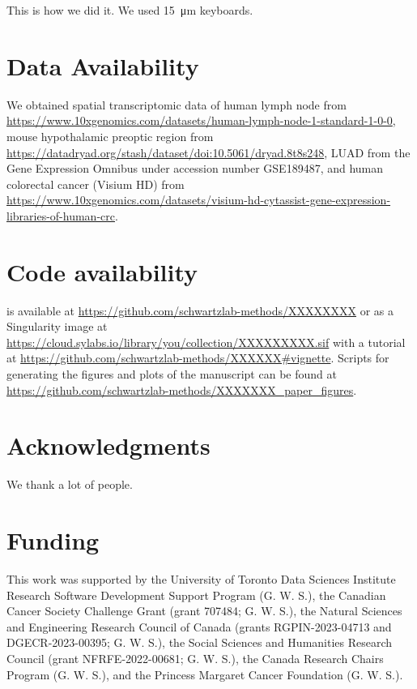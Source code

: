 \begin{refsegment}
This is how we did it. We used \SI{15}{\micro\meter} keyboards.

\section*{Data Availability}

We obtained spatial transcriptomic data of human lymph node from
\url{https://www.10xgenomics.com/datasets/human-lymph-node-1-standard-1-0-0},
mouse hypothalamic preoptic region from
\url{https://datadryad.org/stash/dataset/doi:10.5061/dryad.8t8s248}, LUAD from
the Gene Expression Omnibus under accession number GSE189487, and human
colorectal cancer (Visium HD) from
\url{https://www.10xgenomics.com/datasets/visium-hd-cytassist-gene-expression-libraries-of-human-crc}.

\section*{Code availability}

 is available at
\url{https://github.com/schwartzlab-methods/XXXXXXXX} or as a Singularity image
at \url{https://cloud.sylabs.io/library/you/collection/XXXXXXXXX.sif} with a
tutorial at \url{https://github.com/schwartzlab-methods/XXXXXX#vignette}.
Scripts for generating the figures and plots of the manuscript can be found at
\url{https://github.com/schwartzlab-methods/XXXXXXX_paper_figures}.

\section*{Acknowledgments}

We thank a lot of people.

\section*{Funding}

This work was supported by the University of Toronto Data Sciences Institute
Research Software Development Support Program (G. W. S.), the Canadian Cancer
Society Challenge Grant (grant 707484; G. W. S.), the Natural Sciences and
Engineering Research Council of Canada (grants RGPIN-2023-04713 and
DGECR-2023-00395; G. W. S.), the Social Sciences and Humanities Research Council
(grant NFRFE-2022-00681; G. W. S.), the Canada Research Chairs Program (G. W.
S.), and the Princess Margaret Cancer Foundation (G. W. S.).


\end{refsegment}

